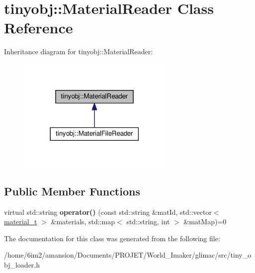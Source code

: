 \hypertarget{classtinyobj_1_1MaterialReader}{}\section{tinyobj\+:\+:Material\+Reader Class Reference}
\label{classtinyobj_1_1MaterialReader}


Inheritance diagram for tinyobj\+:\+:Material\+Reader\+:\nopagebreak
\begin{figure}[H]
\begin{center}
\leavevmode
\includegraphics[width=213pt]{classtinyobj_1_1MaterialReader__inherit__graph}
\end{center}
\end{figure}
\subsection*{Public Member Functions}
\begin{DoxyCompactItemize}
\item 
\mbox{\label{classtinyobj_1_1MaterialReader_afc27ac917abd33dc3ec4a9ae7a519962}} 
virtual std\+::string {\bfseries operator()} (const std\+::string \&mat\+Id, std\+::vector$<$ \hyperlink{structtinyobj_1_1material__t}{material\+\_\+t} $>$ \&materials, std\+::map$<$ std\+::string, int $>$ \&mat\+Map)=0
\end{DoxyCompactItemize}


The documentation for this class was generated from the following file\+:\begin{DoxyCompactItemize}
\item 
/home/6im2/amansion/\+Documents/\+P\+R\+O\+J\+E\+T/\+World\+\_\+\+Imaker/glimac/src/tiny\+\_\+obj\+\_\+loader.\+h\end{DoxyCompactItemize}
